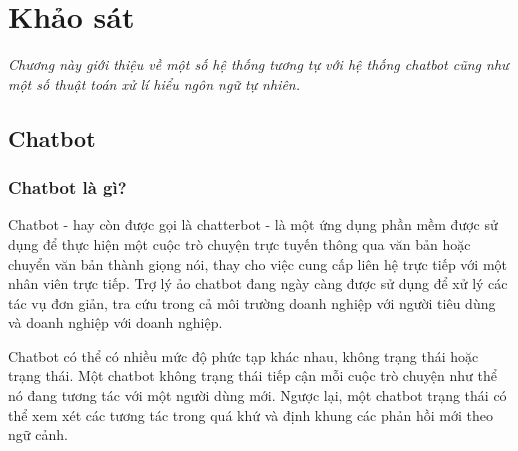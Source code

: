 \chapter{Khảo sát}
\label{Chapter2}

\emph{Chương này giới thiệu về một số hệ thống tương tự với hệ thống chatbot cũng như một số thuật toán xử lí hiểu ngôn ngữ tự nhiên.}

\section{Chatbot}
\subsection{Chatbot là gì?}

Chatbot - hay còn được gọi là chatterbot - là một ứng dụng phần mềm được sử dụng để thực hiện một cuộc trò chuyện trực tuyến thông qua văn bản hoặc chuyển văn bản thành giọng nói, thay cho việc cung cấp liên hệ trực tiếp với một nhân viên trực tiếp. Trợ lý ảo chatbot đang ngày càng được sử dụng để xử lý các tác vụ đơn giản, tra cứu trong cả môi trường doanh nghiệp với người tiêu dùng và doanh nghiệp với doanh nghiệp.

Chatbot có thể có nhiều mức độ phức tạp khác nhau, không trạng thái hoặc trạng thái. Một chatbot không trạng thái tiếp cận mỗi cuộc trò chuyện như thể nó đang tương tác với một người dùng mới. Ngược lại, một chatbot trạng thái có thể xem xét các tương tác trong quá khứ và định khung các phản hồi mới theo ngữ cảnh\cite{chat-bot}.

